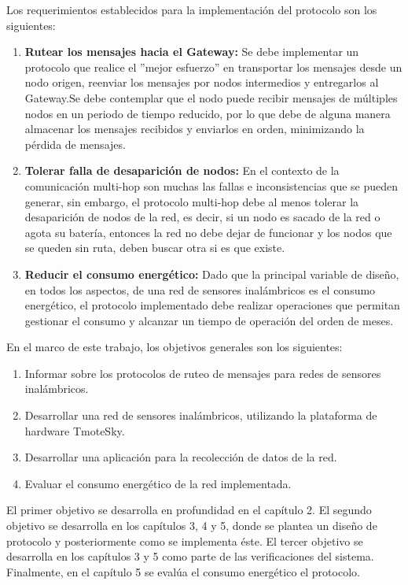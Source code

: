 Los requerimientos establecidos para la implementación del protocolo son los siguientes:

\begin{enumerate}
\item \textbf{Rutear los mensajes hacia el Gateway:} Se debe implementar un protocolo que realice el ''mejor esfuerzo'' en transportar los mensajes desde un nodo origen, reenviar los mensajes por nodos intermedios y entregarlos al Gateway.Se debe contemplar que el nodo puede recibir mensajes de múltiples nodos en un periodo de tiempo reducido, por lo que debe de alguna manera almacenar los mensajes recibidos y enviarlos en orden, minimizando la pérdida de mensajes.\\

\item \textbf{Tolerar falla de desaparición de nodos:} En el contexto de la comunicación multi-hop son muchas las fallas e inconsistencias que se pueden generar, sin embargo, el protocolo multi-hop debe al menos tolerar la desaparición de nodos de la red, es decir, si un nodo es sacado de la red o agota su batería, entonces la red no debe dejar de funcionar y los nodos que se queden sin ruta, deben buscar otra si es que existe.\\

\item\textbf{Reducir el consumo energético:} Dado que la principal variable de diseño, en todos los aspectos, de una red de sensores inalámbricos es el consumo energético, el protocolo implementado debe realizar operaciones que permitan gestionar el consumo y alcanzar un tiempo de operación del orden de meses. \\
\end{enumerate}

En el marco de este trabajo, los objetivos generales son los siguientes:
\begin{enumerate}
  \item Informar sobre los protocolos de ruteo de mensajes para redes de sensores inalámbricos.
  \item Desarrollar una red de sensores inalámbricos, utilizando la plataforma de hardware TmoteSky.
  \item Desarrollar una aplicación para la recolección de datos de la red.
  \item Evaluar el consumo energético de la red implementada.
\end{enumerate}

 El primer objetivo se desarrolla en profundidad en el capítulo 2. El segundo objetivo se desarrolla en los capítulos 3, 4 y 5, donde se plantea un diseño de protocolo y posteriormente como se implementa éste. El tercer objetivo se desarrolla en los capítulos 3 y 5 como parte de las verificaciones del sistema. Finalmente, en el capítulo 5 se evalúa el consumo energético el protocolo.\\
 
